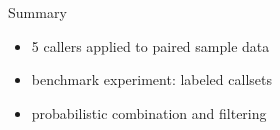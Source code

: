 \documentclass{beamer}
\begin{document}

\begin{frame}{Summary}
\begin{itemize}
\item 5 callers applied to paired sample data
\item benchmark experiment: labeled callsets
\item probabilistic combination and filtering
\end{itemize}
\end{frame}
\end{document}
